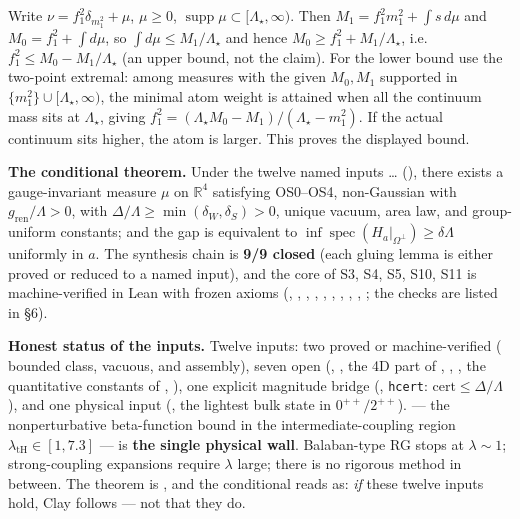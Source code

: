 \begin{proofx}
Write $\nu=f_1^2\delta_{m_1^2}+\mu$, $\mu\ge0$, $\operatorname{supp}\mu\subset
[\Lambda_{\star},\infty)$. Then $M_1=f_1^2m_1^2+\int s\,d\mu$ and
$M_0=f_1^2+\int d\mu$, so $\int d\mu\le M_1/\Lambda_{\star}$ and hence
$M_0\ge f_1^2+M_1/\Lambda_{\star}$, i.e.\ $f_1^2\le M_0-M_1/\Lambda_{\star}$ (an upper bound,
not the claim). For the lower bound use the two-point extremal: among measures with the given
$M_0,M_1$ supported in $\{m_1^2\}\cup[\Lambda_{\star},\infty)$, the minimal atom weight is
attained when all the continuum mass sits at $\Lambda_{\star}$, giving
$f_1^2=(\Lambda_{\star}M_0-M_1)/(\Lambda_{\star}-m_1^2)$. If the actual continuum sits higher,
the atom is larger. This proves the displayed bound.
\end{proofx}

\textbf{The conditional theorem.} Under the twelve named inputs  \ldots{} 
(), there exists a gauge-invariant measure $\mu$ on
$\mathbb{R}^4$ satisfying OS0--OS4, non-Gaussian with $g_{\mathrm{ren}}/\Lambda>0$, with
$\Delta/\Lambda\ge\min(\delta_W,\delta_S)>0$, unique vacuum, area law, and group-uniform
constants; and the gap is equivalent to
$\inf\operatorname{spec}(H_a|_{\Omega^\perp})\ge\delta\Lambda$ uniformly in $a$. The synthesis
chain is \textbf{9/9 closed} (each gluing lemma is either proved or reduced to a named input),
and the core of S3, S4, S5, S10, S11 is machine-verified in Lean with frozen axioms
(, , ,
, , , ,
, , ; the checks are listed
in  \S6).

\textbf{Honest status of the inputs.} Twelve inputs: two proved or machine-verified
( bounded class, vacuous, and  assembly), seven open (,
, the 4D part of , , , the quantitative constants of
, ), one explicit magnitude bridge (, \texttt{hcert}:
$\text{cert}\le\Delta/\Lambda$), and one physical input (, the lightest bulk state in
$0^{++}/2^{++}$).  --- the nonperturbative beta-function bound in the
intermediate-coupling region $\lambda_{\mathrm{tH}}\in[1,7.3]$ --- is \textbf{the single physical
wall}. Balaban-type RG stops at $\lambda\sim1$; strong-coupling expansions require $\lambda$
large; there is no rigorous method in between. The theorem is \LC, and the conditional reads as:
\emph{if} these twelve inputs hold, Clay follows --- not that they do.

